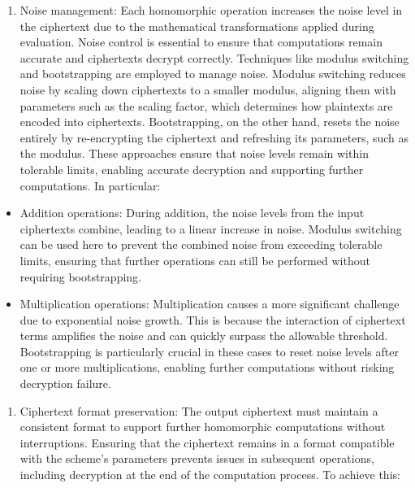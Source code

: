\documentclass[
  letterpaper,
  DIV=11,
  numbers=noendperiod,
  oneside]{scrartcl}
\providecommand{\tightlist}{%
  \setlength{\itemsep}{0pt}\setlength{\parskip}{0pt}}\usepackage{longtable,booktabs,array}
\begin{document}
\begin{itemize}
  \begin{enumerate}
  \def\labelenumi{\arabic{enumi}.}
  \setcounter{enumi}{1}
  \tightlist
  \item
    Noise management: Each homomorphic operation increases the noise
    level in the ciphertext due to the mathematical transformations
    applied during evaluation. Noise control is essential to ensure that
    computations remain accurate and ciphertexts decrypt correctly.
    Techniques like modulus switching and bootstrapping are employed to
    manage noise. Modulus switching reduces noise by scaling down
    ciphertexts to a smaller modulus, aligning them with parameters such
    as the scaling factor, which determines how plaintexts are encoded
    into ciphertexts. Bootstrapping, on the other hand, resets the noise
    entirely by re-encrypting the ciphertext and refreshing its
    parameters, such as the modulus. These approaches ensure that noise
    levels remain within tolerable limits, enabling accurate decryption
    and supporting further computations. In particular:
  \end{enumerate}

  \begin{itemize}
  \item
    Addition operations: During addition, the noise levels from the
    input ciphertexts combine, leading to a linear increase in noise.
    Modulus switching can be used here to prevent the combined noise
    from exceeding tolerable limits, ensuring that further operations
    can still be performed without requiring bootstrapping.
  \item
    Multiplication operations: Multiplication causes a more significant
    challenge due to exponential noise growth. This is because the
    interaction of ciphertext terms amplifies the noise and can quickly
    surpass the allowable threshold. Bootstrapping is particularly
    crucial in these cases to reset noise levels after one or more
    multiplications, enabling further computations without risking
    decryption failure.
  \end{itemize}

  \begin{enumerate}
  \def\labelenumi{\arabic{enumi}.}
  \setcounter{enumi}{2}
  \tightlist
  \item
    Ciphertext format preservation: The output ciphertext must maintain
    a consistent format to support further homomorphic computations
    without interruptions. Ensuring that the ciphertext remains in a
    format compatible with the scheme's parameters prevents issues in
    subsequent operations, including decryption at the end of the
    computation process. To achieve this:
  \end{enumerate}


\end{itemize}
\end{document}

